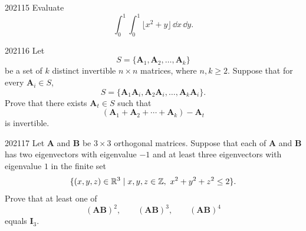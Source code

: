 \begin{problem}{2021}{1}{5}
Evaluate
\[
    \int_0^1\int_0^1\lfloor x^2+y\rfloor\, \dd x\, \dd y.
\]
\end{problem}

\begin{problem}{2021}{1}{6}
Let
\[
    S=\{\mathbf A_1, \mathbf A_2, \dots, \mathbf A_k\}
\]
be a set of $k$ distinct invertible $n\times n$ matrices, where $n, k\ge2$. Suppose that for every $\mathbf A_i\in S$,
\[
    S=\{\mathbf A_1\mathbf A_i, \mathbf A_2\mathbf A_i, \dots, \mathbf A_k\mathbf A_i\}.
\]
Prove that there exists $\mathbf A_t\in S$ such that
\[
    (\mathbf A_1+\mathbf A_2+\cdots+\mathbf A_k)-\mathbf A_t
\]
is invertible.
\end{problem}

\begin{problem}{2021}{1}{7}
Let $\mathbf A$ and $\mathbf B$ be $3\times3$ orthogonal matrices. Suppose that each of $\mathbf A$ and $\mathbf B$ has two eigenvectors with eigenvalue $-1$ and at least three eigenvectors with eigenvalue $1$ in the finite set
\[
    \{(x, y, z)\in\mathbb{R}^3\mid x, y, z\in\mathbb{Z}, \ x^2+y^2+z^2\le2\}.
\]
Prove that at least one of
\[
    (\mathbf A\mathbf B)^2,
    \qquad
    (\mathbf A\mathbf B)^3,
    \qquad
    (\mathbf A\mathbf B)^4
\]
equals $\mathbf I_3$.
\end{problem}
